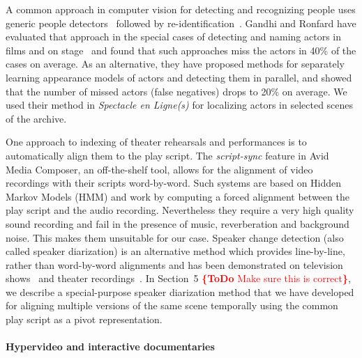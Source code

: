\documentclass[conference]{IEEEtran}
\newcommand{\todo}[1]{\noindent\textcolor{red}{{\bf \{ToDo} #1{\bf \}}}}
\begin{document}
A common approach in computer vision for detecting and recognizing people uses generic people detectors~\cite{Ronfard02,
Dalal05,Felzenszwalb10,Andriluka12} followed by re-identification~\cite{TapaswiBS12}. Gandhi and Ronfard have evaluated 
that approach in the special cases of detecting and naming actors in films and on stage~\cite{Gandhi13} and found that such 
approaches miss the actors in 40\% of the cases on average. As an alternative, they have proposed
methods for separately learning appearance models of actors and detecting them in parallel, and showed that the number
of missed actors (false negatives) drops to 20\% on average. We used their method in \emph{Spectacle en Ligne(s)} for localizing
actors in selected scenes of the archive.

One approach to indexing of theater rehearsals and performances is to automatically align
them to the play script. The {\em script-sync} feature in Avid Media Composer,
an off-the-shelf tool, allows for the alignment of video recordings with their scripts word-by-word. Such systems
are based on Hidden Markov Models (HMM) and work by computing  a forced alignment 
between the play script and the audio recording. Nevertheless they require a very high quality 
sound recording and fail in the presence of music, reverberation and background noise. This makes them
unsuitable for our case. Speaker change detection (also called speaker diarization) is an alternative method
which provides line-by-line, rather than word-by-word alignments and has been demonstrated 
on television shows~\cite{Sankar09} and theater recordings~\cite{Caillet07,Caillet13}. In Section~5 \todo{Make sure this is correct},
we describe a special-purpose speaker diarization method that we have developed for aligning multiple versions 
of the same scene temporally using the common play script as a pivot representation.


\paragraph*{Hypervideo and interactive documentaries}
\end{document}
